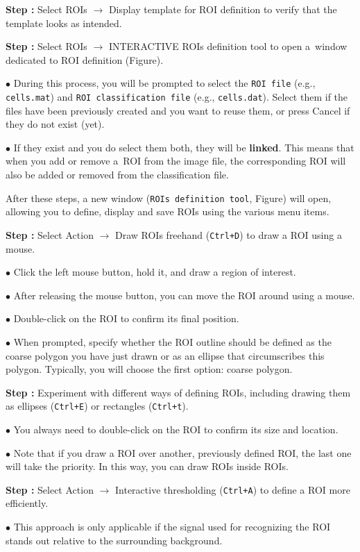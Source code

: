 \documentclass[a4paper, 11pt]{article}
\newcommand{\ttt}[1]{\texttt{#1}}
\newcommand{\lans}[1]{{\color{magenta}#1}}
\newcommand\ra{\rightarrow}
\newcounter{step}
\newcommand\s{\addtocounter{step}{1}\noindent\textbf{Step \thestep:}{ }}
\newcommand\bul{\noindent$\bullet${ }}
\newcommand\bb[1]{\textbf{#1}}
\begin{document}
\s Select \lans{ROIs} $\ra$ \lans{Display template for ROI definition} to verify that the template looks as intended. 

\s Select \lans{ROIs} $\ra$ \lans{INTERACTIVE ROIs definition tool} to open a~window dedicated to ROI definition (Figure). 

\bul During this process, you will be prompted to select the \ttt{ROI file} (e.g., \ttt{cells.mat}) and \ttt{ROI classification file} (e.g., \ttt{cells.dat}). Select them if the files have been previously created and you want to reuse them, or press \lans{Cancel} if they do not exist (yet).

\bul If they exist and you do select them both, they will be \bb{linked}. This means that when you add or remove a~ROI from the image file, the corresponding ROI will also be added or removed from the classification file.

After these steps, a new window (\ttt{ROIs definition tool}, Figure) will open, allowing you to define, display and save ROIs using the various menu items.

\setcounter{step}{0}

\s Select \lans{Action} $\ra$ \lans{Draw ROIs freehand} (\ttt{Ctrl+D}) to draw a ROI using a mouse.

\bul Click the left mouse button, hold it, and draw a region of interest. 

\bul After releasing the mouse button, you can move the ROI around using a mouse. 

\bul Double-click on the ROI to confirm its final position.

\bul When prompted, specify whether the ROI outline should be defined as the \lans{coarse polygon} you have just drawn or as an \lans{ellipse that circumscribes} this polygon. Typically, you will choose the first option: coarse polygon.

\s Experiment with different ways of defining ROIs, including drawing them as \lans{ellipses} (\ttt{Ctrl+E}) or \lans{rectangles} (\ttt{Ctrl+t}).

\bul You always need to double-click on the ROI to confirm its size and location.

\bul Note that if you draw a ROI over another, previously defined ROI, the last one will take the priority. In this way, you can draw ROIs inside ROIs.

\s Select \lans{Action} $\ra$ \lans{Interactive thresholding} (\ttt{Ctrl+A}) to define a ROI more efficiently. 

\bul This approach is only applicable if the signal used for recognizing the ROI stands out relative to the surrounding background.
\end{document}
